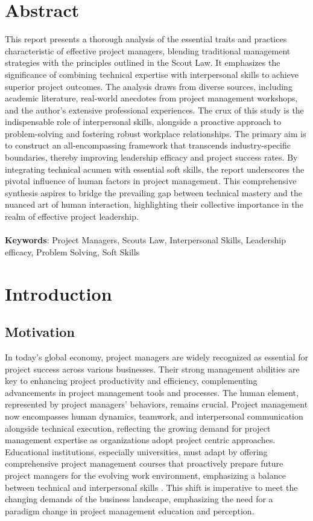 \documentclass{article}
\begin{document}
\section*{Abstract}
This report presents a thorough analysis of the essential traits and practices characteristic of effective project managers, blending traditional management strategies with the principles outlined in the Scout Law. It emphasizes the significance of combining technical expertise with interpersonal skills to achieve superior project outcomes. The analysis draws from diverse sources, including academic literature, real-world anecdotes from project management workshops, and the author's extensive professional experiences. The crux of this study is the indispensable role of interpersonal skills, alongside a proactive approach to problem-solving and fostering robust workplace relationships. The primary aim is to construct an all-encompassing framework that transcends industry-specific boundaries, thereby improving leadership efficacy and project success rates. By integrating technical acumen with essential soft skills, the report underscores the pivotal influence of human factors in project management. This comprehensive synthesis aspires to bridge the prevailing gap between technical mastery and the nuanced art of human interaction, highlighting their collective importance in the realm of effective project leadership.
\\ \\
\textbf{Keywords}: Project Managers, Scouts Law, Interpersonal Skills, Leadership efficacy, Problem Solving, Soft Skills

\newpage

\section{Introduction}
\subsection{Motivation}
In today's global economy, project managers are widely recognized as essential for project success across various businesses. Their strong management abilities are key to enhancing project productivity and efficiency, complementing advancements in project management tools and processes. The human element, represented by project managers' behaviors, remains crucial. Project management now encompasses human dynamics, teamwork, and interpersonal communication alongside technical execution, reflecting the growing demand for project management expertise as organizations adopt project centric approaches. Educational institutions, especially universities, must adapt by offering comprehensive project management courses that proactively prepare future project managers for the evolving work environment, emphasizing a balance between technical and interpersonal skills \cite{pant2008project}. This shift is imperative to meet the changing demands of the business landscape, emphasizing the need for a paradigm change in project management education and perception.
\end{document}

